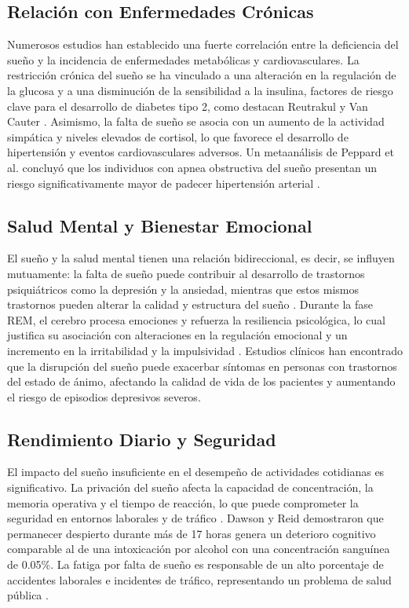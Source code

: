 \subsection{Relación con Enfermedades Crónicas}

Numerosos estudios han establecido una fuerte correlación entre la deficiencia del sueño y la incidencia de enfermedades metabólicas y cardiovasculares. La restricción crónica del sueño se ha vinculado a una alteración en la regulación de la glucosa y a una disminución de la sensibilidad a la insulina, factores de riesgo clave para el desarrollo de diabetes tipo 2, como destacan Reutrakul y Van Cauter \cite{relacionEnfermedadesCronicas}. Asimismo, la falta de sueño se asocia con un aumento de la actividad simpática y niveles elevados de cortisol, lo que favorece el desarrollo de hipertensión y eventos cardiovasculares adversos. Un metaanálisis de Peppard et al. concluyó que los individuos con apnea obstructiva del sueño presentan un riesgo significativamente mayor de padecer hipertensión arterial \cite{hipertensionSueño}.



\subsection{Salud Mental y Bienestar Emocional}

El sueño y la salud mental tienen una relación bidireccional, es decir, se influyen mutuamente: la falta de sueño puede contribuir al desarrollo de trastornos psiquiátricos como la depresión y la ansiedad, mientras que estos mismos trastornos pueden alterar la calidad y estructura del sueño \cite{baglioni2016sleep}. Durante la fase REM, el cerebro procesa emociones y refuerza la resiliencia psicológica, lo cual justifica su asociación con alteraciones en la regulación emocional y un incremento en la irritabilidad y la impulsividad \cite{walker2009overnight}. Estudios clínicos han encontrado que la disrupción del sueño puede exacerbar síntomas en personas con trastornos del estado de ánimo, afectando la calidad de vida de los pacientes y aumentando el riesgo de episodios depresivos severos.

\subsection{Rendimiento Diario y Seguridad}

El impacto del sueño insuficiente en el desempeño de actividades cotidianas es significativo. La privación del sueño afecta la capacidad de concentración, la memoria operativa y el tiempo de reacción, lo que puede comprometer la seguridad en entornos laborales y de tráfico \cite{williamson2000moderate}. Dawson y Reid demostraron que permanecer despierto durante más de 17 horas genera un deterioro cognitivo comparable al de una intoxicación por alcohol con una concentración sanguínea de 0.05\%. La fatiga por falta de sueño es responsable de un alto porcentaje de accidentes laborales e incidentes de tráfico, representando un problema de salud pública \cite{dawson1997fatigue}.

